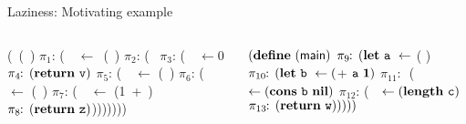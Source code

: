 \documentclass[xcolor=x11names,compress,mathserif]{beamer}
\renewcommand{\(}{\begin{columns}}
\renewcommand{\)}{\end{columns}}
\newcommand{\<}[1]{\begin{column}{#1}}
\renewcommand{\>}{\end{column}}
\begin{document}
\begin{frame} {Laziness: Motivating example}
\small
\begin{columns}
\begin{column}[T]{.45\textwidth}
  \renewcommand{\arraystretch}{1.1}{
    \begin{uprogram}
      \UFL (\DEFINE\ (\length~\xl)
        $\pi_1\!\!:\, ${(\LET\ \px\ $\leftarrow $\ (\NULLQ~\xl) }\IN
       \hspace*{.05cm} $\pi_2\!\!:\,$(\SIF\  \px
       \hspace*{.27cm} $\pi_3\!\!:\, $(\LET\ \pv\ $\leftarrow 0$ \IN
       \hspace*{.32cm} $\pi_4\!\!:\,
      (\mbox{$\mathbf{ return}$}~\mbox{\tt v})$
       \hspace*{.29cm}    $\pi_5\!\!:\, ${(\LET~\pu\
        $\leftarrow$  (\CDR~\xl)  }\IN
       \hspace*{.34cm}   $\pi_6\!\!:\, ${(\LET~\py\
        $\leftarrow$  (\length~\pu)  }\IN
      \UNL{5} \hspace*{.34cm} $\pi_7\!\!:\,
      ${(\LET~\pz\ $\leftarrow$ (1~+~\py) }\IN
      \UNL{6} \hspace*{.34cm} $\pi_8\!\!:\,
      {(\mbox{$\mathbf{ return}$}~\mbox{\tt z})}$)))))))
  \end{uprogram}}
\end{column}
\begin{column}[T]{0.45\textwidth}
\renewcommand{\arraystretch}{1.1}{
    \begin{uprogram}
       $(\mbox{$\mathbf{define}$}\ ({\sf main})$
       \!\!$\pi_9\!\!:\, (\mbox{$\mathbf{ let}$}\  \mbox{\tt a}\  \leftarrow$
      (
      ) \IN  
       \!\!$\pi_{10}\!\!:\, (\mbox{$\mathbf{ let}$}\  \mbox{\tt b}\  \leftarrow ($+$\ \mbox{\tt a}\ \mathbf{1})$
      \IN
      \UNL{4}   \hspace*{.05cm}$\pi_{11}\!\!:\,      $ (\LET\ \pc\
      $\leftarrow  (\mbox{$\mathbf{cons}$}\ \mbox{\tt b}\ \mbox{$\mathbf{ nil}$})$ \IN
         \hspace*{.15cm}    $\pi_{12}\!\!:\,
      $(\LET\ \pw\  $\leftarrow  (\mathbf{length}\ \mbox{\tt c})$ \IN
      \UNL{6}  \hspace*{.25cm}  $\pi_{13}\!\!:\,
      (\mbox{$\mathbf{ return}$}~\mbox{\tt w})))))$
  \end{uprogram}}
\end{column}
\end{columns}
\end{frame}
\end{document}
